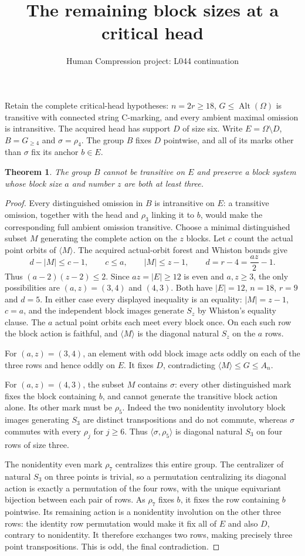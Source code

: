 \documentclass[11pt,a4paper]{article}
\title{The remaining block sizes at a critical head}
\author{Human Compression project: L044 continuation}
\date{}
\newtheorem{theorem}{Theorem}
\newcommand{\gen}[1]{\langle#1\rangle}
\begin{document}
\maketitle
Retain the complete critical-head hypotheses: $n=2r\ge18$,
$G\le\operatorname{Alt}(\Omega)$ is transitive with connected
string C-marking, and every ambient maximal omission is
intransitive. The acquired head has support $D$ of size six.
Write $E=\Omega\setminus D$, $B=G_{\ge4}$ and
$\sigma=\rho_4$. The group $B$ fixes $D$ pointwise, and
all of its marks other than $\sigma$ fix its anchor $b\in E$.

\begin{theorem}
The group $B$ cannot be transitive on $E$ and preserve a block
system whose block size $a$ and number $z$ are both at least three.
\end{theorem}
\begin{proof}
Every distinguished omission in $B$ is intransitive on $E$:
a transitive omission, together with the head and $\rho_3$
linking it to $b$, would make the corresponding full ambient
omission transitive. Choose a minimal distinguished subset $M$
generating the complete action on the $z$ blocks. Let $c$ count
the actual point orbits of $\gen M$. The acquired actual-orbit
forest and Whiston bounds give
\[
 d-|M|\le c-1,\qquad c\le a,\qquad |M|\le z-1,
 \qquad d=r-4=\frac{az}{2}-1.
\]
Thus $(a-2)(z-2)\le2$. Since $az=|E|\ge12$ is even
and $a,z\ge3$, the only possibilities are $(a,z)=(3,4)$
and $(4,3)$. Both have $|E|=12$, $n=18$, $r=9$ and $d=5$.
In either case every displayed inequality is an equality:
$|M|=z-1$, $c=a$, and the independent block images generate
$S_z$ by Whiston's equality clause. The $a$ actual point
orbits each meet every block once. On each such row the
block action is faithful, and $\gen M$ is the diagonal
natural $S_z$ on the $a$ rows.

For $(a,z)=(3,4)$, an element with odd block image acts
oddly on each of the three rows and hence oddly on $E$.
It fixes $D$, contradicting $\gen M\le G\le A_n$.

For $(a,z)=(4,3)$, the subset $M$ contains $\sigma$:
every other distinguished mark fixes the block containing
$b$, and cannot generate the transitive block action alone.
Its other mark must be $\rho_5$. Indeed the two nonidentity
involutory block images generating $S_3$ are distinct
transpositions and do not commute, whereas $\sigma$ commutes
with every $\rho_j$ for $j\ge6$.
Thus $\gen{\sigma,\rho_5}$ is diagonal natural $S_3$
on four rows of size three.

The nonidentity even mark $\rho_7$ centralizes this entire
group. The centralizer of natural $S_3$ on three points is
trivial, so a permutation centralizing its diagonal action
is exactly a permutation of the four rows, with the unique
equivariant bijection between each pair of rows. As $\rho_7$
fixes $b$, it fixes the row containing $b$ pointwise.
Its remaining action is a nonidentity involution on the
other three rows: the identity row permutation would make
it fix all of $E$ and also $D$, contrary to nonidentity.
It therefore exchanges two rows, making precisely three
point transpositions. This is odd, the final contradiction.
\end{proof}
\end{document}

